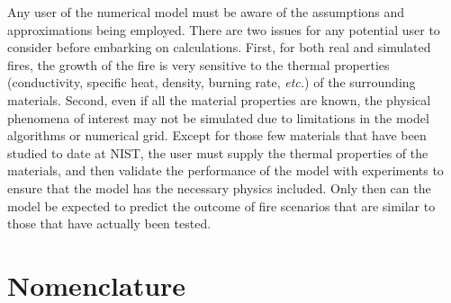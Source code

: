 \documentclass[11pt]{book}
\begin{document}
Any user of the numerical model must be aware of the assumptions and
approximations being employed. There are two issues for any potential
user to consider before embarking on calculations.
First, for both real and simulated fires, the growth of the fire
is very sensitive
to the thermal properties (conductivity, specific heat, density, burning
rate, {\em etc.})
of the surrounding materials. Second, even if all
the material properties are known, the physical phenomena of interest
may not be simulated due to limitations in the model algorithms or
numerical grid. Except for those few
materials that have been studied to date at NIST,
the user must supply the thermal properties
of the materials, and then validate the performance of the model with
experiments to ensure that the model has the necessary physics included.
Only then can the model be expected to predict the
outcome of fire scenarios that are similar to those that have actually been
tested.







\appendix


\chapter{Nomenclature}
\label{nomenclature}
\end{document}
